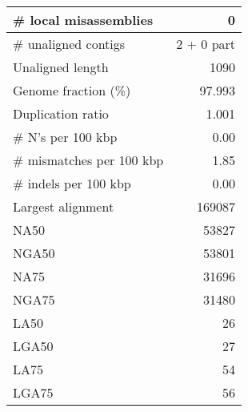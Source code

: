 \documentclass[12pt,a4paper]{article}
\begin{document}
\begin{table}[ht]
\begin{center}
\begin{tabular}{|l*{1}{|r}|}
\# local misassemblies & 0 \\ \hline
\# unaligned contigs & 2 + 0 part \\ \hline
Unaligned length & 1090 \\ \hline
Genome fraction (\%) & 97.993 \\ \hline
Duplication ratio & 1.001 \\ \hline
\# N's per 100 kbp & 0.00 \\ \hline
\# mismatches per 100 kbp & 1.85 \\ \hline
\# indels per 100 kbp & 0.00 \\ \hline
Largest alignment & 169087 \\ \hline
NA50 & 53827 \\ \hline
NGA50 & 53801 \\ \hline
NA75 & 31696 \\ \hline
NGA75 & 31480 \\ \hline
LA50 & 26 \\ \hline
LGA50 & 27 \\ \hline
LA75 & 54 \\ \hline
LGA75 & 56 \\ \hline
\end{tabular}
\end{center}
\end{table}
\end{document}
